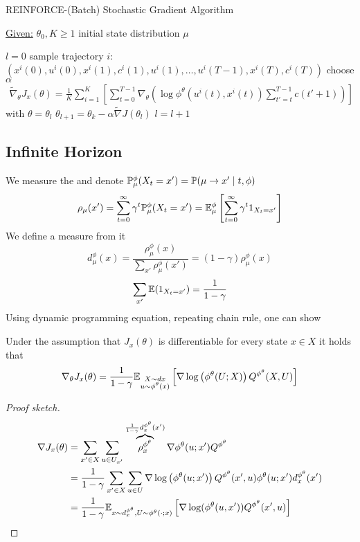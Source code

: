 \begin{algorithm}[H]
    \caption{REINFORCE-(Batch) Stochastic Gradient Algorithm}\label{alg:reinforce}
    \underline{Given:} \(\theta_0,K\geq 1\) initial state distribution \(\mu\)
    \begin{algorithmic}
    \State \(l=0\)
            \State sample trajectory \(i\): \((x^i(0),u^i(0),x^i(1),c^i(1),u^i(1),\dots, u^i(T-1),x^i(T),c^i(T))\)
        \EndFor
        \State choose \(\alpha\)
        \State \begin{align*}
            \tilde{\nabla}_\theta J_x(\theta)=\frac{1}{K}\sum_{i=1}^K\left[\sum_{t=0}^{T-1}\nabla_\theta \left(\log \phi^\theta(u^i(t),x^i(t))\sum_{t'=t}^{T-1}c(t'+1)\right)\right]
        \end{align*} with \(\theta=\theta_l\)
        \State \(\theta_{l+1}=\theta_k-\alpha \tilde{\nabla}J(\theta_l)\)
        \State \(l=l+1\) 
    \EndWhile
\end{algorithmic}
\end{algorithm}

\subsection{Infinite Horizon}
We measure the  and denote \(\mathbb{P}_\mu^\phi(X_t=x')=\mathbb{P}(\mu\to x'\mid t,\phi)\)
\[\rho_\mu(x')=\sum_{t=0}^{\infty}\gamma^t\mathbb{P}_\mu^\phi(X_t=x')=\mathbb{E}_\mu^\phi\left[\sum_{t=0}^{\infty}\gamma^t 1_{X_t=x'}\right]\]
We define a measure from it 
\[d_\mu^\phi(x)=\frac{\rho_\mu^\phi(x)}{\sum_{x'}\rho_\mu^\phi(x')}=(1-\gamma)\rho_\mu^\phi(x)\]
\[\sum_{x'}\mathbb{E}(1_{X_t=x'})=\frac{1}{1-\gamma}\] %
Using dynamic programming equation, repeating chain rule, one can show 
\begin{theorem}\label{thm:56}
Under the assumption that \(J_x(\theta)\) is differentiable for every state \(x\in X\) it holds 
that 
\[\nabla_\theta J_x(\theta)=\frac{1}{1-\gamma}\mathbb{E}_{\substack{X\sim dx\\u\sim \phi^\theta(x)}}\left[\nabla\log\left(\phi^\theta(U;X)\right)Q^{\phi^\theta}(X,U)\right]\]    
\end{theorem}

\begin{proof}[Proof sketch]

\begin{align*}
    \nabla J_x(\theta)&=\sum_{x'\in X}\sum_{u\in U_{x'}}\overbrace{\rho_x^{\phi^\theta}}^{\frac{1}{1-\gamma}d_x^{\phi^\theta}(x')}\nabla\phi^\theta(u;x')Q^{\phi^\theta}\\
    &=\frac{1}{1-\gamma}\sum_{x'\in X}\sum_{u\in U}\nabla\log\left(\phi^\theta(u;x')\right)Q^{\phi^\theta}(x',u)\phi^\theta(u;x')d_x^{\phi^\theta}(x')\\
    &=\frac{1}{1-\gamma}\mathbb{E}_{x\sim d_x^{\phi^\theta},U\sim\phi^\theta(\cdot;x)}\left[\nabla\log (\phi^\theta(u,x'))Q^{\phi^\theta}(x',u)\right]
\end{align*}

\end{proof}

